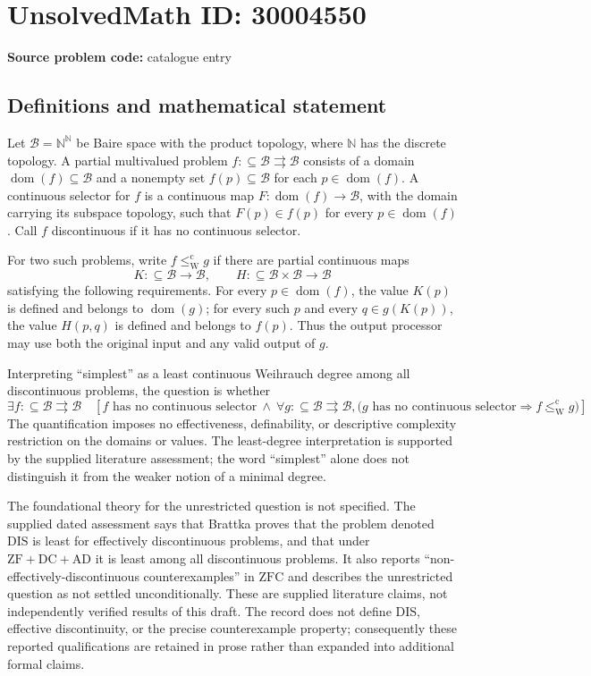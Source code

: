 \documentclass[11pt]{article}
\newcommand{\N}{\mathbb{N}}
\begin{document}
\section*{UnsolvedMath ID: 30004550}
\textbf{Source problem code:} catalogue entry
\subsection{Definitions and mathematical statement}
Let \(\mathcal B=\N^{\N}\) be Baire space with the product topology, where \(\N\) has the discrete topology. A partial multivalued problem \(f:\subseteq\mathcal B\rightrightarrows\mathcal B\) consists of a domain \(\operatorname{dom}(f)\subseteq\mathcal B\) and a nonempty set \(f(p)\subseteq\mathcal B\) for each \(p\in\operatorname{dom}(f)\). A continuous selector for \(f\) is a continuous map \(F:\operatorname{dom}(f)\to\mathcal B\), with the domain carrying its subspace topology, such that \(F(p)\in f(p)\) for every \(p\in\operatorname{dom}(f)\). Call \(f\) discontinuous if it has no continuous selector.

For two such problems, write \(f\leq_{\mathrm W}^{\mathrm c}g\) if there are partial continuous maps
\[
K:\subseteq\mathcal B\to\mathcal B,
\qquad
H:\subseteq\mathcal B\times\mathcal B\to\mathcal B
\]
satisfying the following requirements. For every \(p\in\operatorname{dom}(f)\), the value \(K(p)\) is defined and belongs to \(\operatorname{dom}(g)\); for every such \(p\) and every \(q\in g(K(p))\), the value \(H(p,q)\) is defined and belongs to \(f(p)\). Thus the output processor may use both the original input and any valid output of \(g\).

Interpreting ``simplest'' as a least continuous Weihrauch degree among all discontinuous problems, the question is whether
\[
\exists f:\subseteq\mathcal B\rightrightarrows\mathcal B\quad
\left[
 f\text{ has no continuous selector}
 \ \land\ 
 \forall g:\subseteq\mathcal B\rightrightarrows\mathcal B,
 \bigl(g\text{ has no continuous selector}
 \Longrightarrow f\leq_{\mathrm W}^{\mathrm c}g\bigr)
\right].
\]
The quantification imposes no effectiveness, definability, or descriptive complexity restriction on the domains or values. The least-degree interpretation is supported by the supplied literature assessment; the word ``simplest'' alone does not distinguish it from the weaker notion of a minimal degree.

The foundational theory for the unrestricted question is not specified. The supplied dated assessment says that Brattka proves that the problem denoted \(\mathrm{DIS}\) is least for effectively discontinuous problems, and that under \(\mathrm{ZF}+\mathrm{DC}+\mathrm{AD}\) it is least among all discontinuous problems. It also reports ``non-effectively-discontinuous counterexamples'' in \(\mathrm{ZFC}\) and describes the unrestricted question as not settled unconditionally. These are supplied literature claims, not independently verified results of this draft. The record does not define \(\mathrm{DIS}\), effective discontinuity, or the precise counterexample property; consequently these reported qualifications are retained in prose rather than expanded into additional formal claims.
\end{document}
